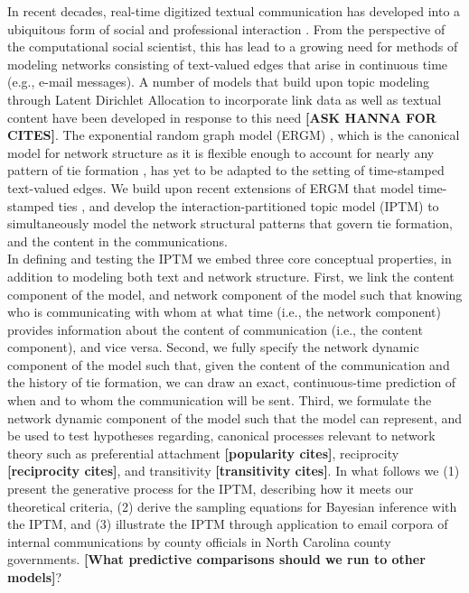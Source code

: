 \documentclass[a4paper]{article}
\begin{document}
In recent decades, real-time digitized textual communication has developed into a ubiquitous form of social and professional interaction \citep[see, e.g.,][]{kanungo2008modeling, szostek2011dealing, burgess2004email, pew2016}. From the perspective of the computational social scientist, this has lead to a growing need for methods of modeling networks consisting of text-valued edges that arise in continuous time (e.g., e-mail messages). A number of models that build upon topic modeling through Latent Dirichlet Allocation \citep{Blei2003} to incorporate link data as well as textual content have been developed in response to this need {\bf [ASK HANNA FOR CITES]}.  The exponential random graph model (ERGM) \citep{robins2007introduction,chatterjee2013estimating,hunter2008ergm}, which is the canonical model for network structure as it is flexible enough to account for nearly any pattern of tie formation \citep{desmarais2017statistical}, has yet to be adapted to the setting of time-stamped text-valued edges. We build upon recent extensions of ERGM that model time-stamped ties \citep{PerryWolfe2012,Butts2008}, and develop the interaction-partitioned topic model (IPTM) to simultaneously model the network structural patterns that govern tie formation, and the content in the communications.\\ \newline
In defining and testing the IPTM we embed three core conceptual properties, in addition to modeling both text and network structure. First, we link the content component of the model, and network component of the model such that knowing who is communicating with whom at what time (i.e., the network component) provides information about the content of communication (i.e., the content component),  and vice versa. Second, we fully specify the network dynamic component of the model such that, given the content of the communication and the history of tie formation, we can draw an exact, continuous-time prediction of when and to whom the communication will be sent. Third, we formulate the network dynamic component of the model such that the model can represent, and be used to test hypotheses regarding, canonical processes relevant to network theory such as preferential attachment {\bf [popularity cites]}, reciprocity {\bf [reciprocity cites]}, and transitivity {\bf [transitivity cites]}. In what follows we (1) present the generative process for the IPTM, describing how it meets our theoretical criteria, (2) derive the sampling equations for Bayesian inference with the IPTM, and (3) illustrate the IPTM through application to email corpora of internal communications by county officials in North Carolina county governments. {\bf [What predictive comparisons should we run to other models]}?
\end{document}
